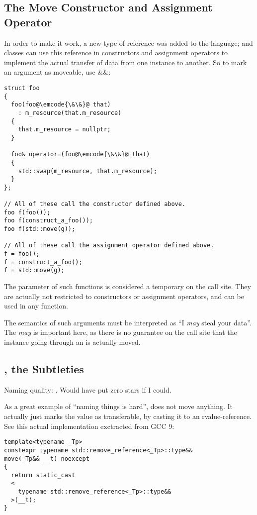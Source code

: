 \subsection{The Move Constructor and Assignment Operator}
\label{sec:move-constructor}

In order to make it work, a new type of reference was added to
the language; and classes can use this reference in constructors and
assignment operators to implement the actual transfer of data from one
instance to another. So to mark an argument as moveable, use \&\&:

\begin{lstlisting}
struct foo
{
  foo(foo@\emcode{\&\&}@ that)
    : m_resource(that.m_resource)
  {
    that.m_resource = nullptr;
  }

  foo& operator=(foo@\emcode{\&\&}@ that)
  {
    std::swap(m_resource, that.m_resource);
  }
};

// All of these call the constructor defined above.
foo f(foo());
foo f(construct_a_foo());
foo f(std::move(g));

// All of these call the assignment operator defined above.
f = foo();
f = construct_a_foo();
f = std::move(g);
\end{lstlisting}

The parameter of such functions is considered a temporary on the call
site. They are actually not restricted to constructors or assignment
operators, and can be used in any function.

The semantics of such arguments must be interpreted as ``I {\em may}
steal your data''. The {\em may} is important here, as there is no
guarantee on the call site that the instance going through an
 is actually moved.

\subsection{, the Subtleties}

Naming quality: \faStar\faStarO\faStarO\faStarO\faStarO. Would have
put zero stars if I could.

As a great example of ``naming things is hard'',  does
not move anything. It actually just marks the value as transferable,
by casting it to an rvalue-reference. See this actual implementation
exctracted from GCC 9:

\begin{lstlisting}
template<typename _Tp>
constexpr typename std::remove_reference<_Tp>::type&&
move(_Tp&& __t) noexcept
{
  return static_cast
  <
    typename std::remove_reference<_Tp>::type&&
  >(__t);
}
\end{lstlisting}

